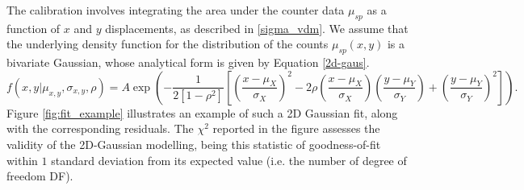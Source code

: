 The calibration involves integrating the area under the counter data $\mu_{sp}$ as a function of $x$ and $y$ displacements, as described in \eqref{sigma_vdm}. We assume that the underlying density function for the distribution of the counts $\mu_{sp}(x,y)$ is a bivariate Gaussian, whose analytical form is given by Equation \eqref{2d-gaus}. 
\begin{equation}
    f(x,y|\mu_{x,y},\sigma_{x,y},\rho)=A\exp{\left(-{\frac {1}{2\left[1-\rho ^{2}\right]}}\left[\left({\frac {x-\mu _{X}}{\sigma _{X}}}\right)^{2}-2\rho \left({\frac {x-\mu _{X}}{\sigma _{X}}}\right)\left({\frac {y-\mu _{Y}}{\sigma _{Y}}}\right)+\left({\frac {y-\mu _{Y}}{\sigma _{Y}}}\right)^{2}\right]\right)}\label{2d-gaus}.
\end{equation}
Figure \ref{fig:fit_example} illustrates an example of such a 2D Gaussian fit, along with the corresponding residuals. The $\chi^2$ reported in the figure assesses the validity of the 2D-Gaussian modelling, being this statistic of goodness-of-fit within $1$ standard deviation from its expected value (i.e. the number of degree of freedom DF).


